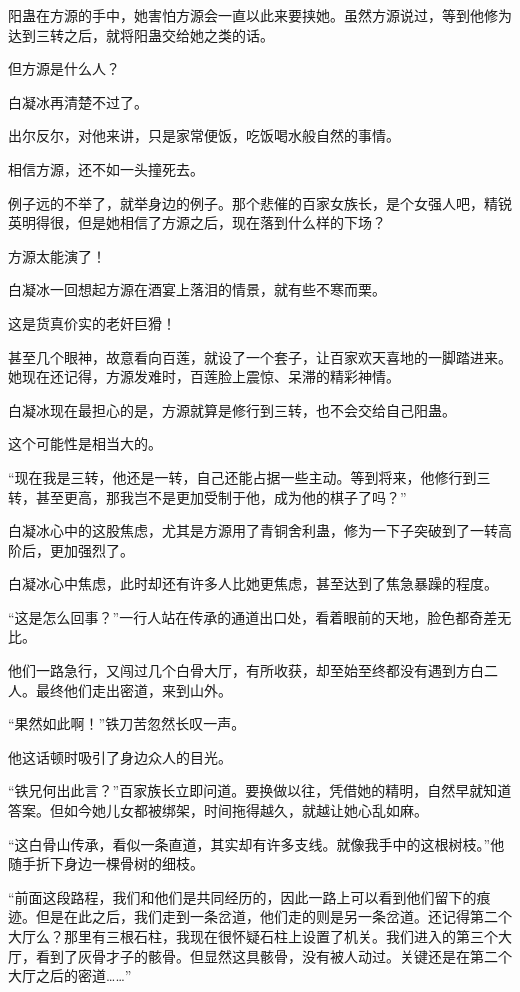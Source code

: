 \begin{this_body}
阳蛊在方源的手中，她害怕方源会一直以此来要挟她。虽然方源说过，等到他修为达到三转之后，就将阳蛊交给她之类的话。

但方源是什么人？

白凝冰再清楚不过了。

出尔反尔，对他来讲，只是家常便饭，吃饭喝水般自然的事情。

相信方源，还不如一头撞死去。

例子远的不举了，就举身边的例子。那个悲催的百家女族长，是个女强人吧，精锐英明得很，但是她相信了方源之后，现在落到什么样的下场？

方源太能演了！

白凝冰一回想起方源在酒宴上落泪的情景，就有些不寒而栗。

这是货真价实的老奸巨猾！

甚至几个眼神，故意看向百莲，就设了一个套子，让百家欢天喜地的一脚踏进来。她现在还记得，方源发难时，百莲脸上震惊、呆滞的精彩神情。

白凝冰现在最担心的是，方源就算是修行到三转，也不会交给自己阳蛊。

这个可能性是相当大的。

“现在我是三转，他还是一转，自己还能占据一些主动。等到将来，他修行到三转，甚至更高，那我岂不是更加受制于他，成为他的棋子了吗？”

白凝冰心中的这股焦虑，尤其是方源用了青铜舍利蛊，修为一下子突破到了一转高阶后，更加强烈了。

白凝冰心中焦虑，此时却还有许多人比她更焦虑，甚至达到了焦急暴躁的程度。

“这是怎么回事？”一行人站在传承的通道出口处，看着眼前的天地，脸色都奇差无比。

他们一路急行，又闯过几个白骨大厅，有所收获，却至始至终都没有遇到方白二人。最终他们走出密道，来到山外。

“果然如此啊！”铁刀苦忽然长叹一声。

他这话顿时吸引了身边众人的目光。

“铁兄何出此言？”百家族长立即问道。要换做以往，凭借她的精明，自然早就知道答案。但如今她儿女都被绑架，时间拖得越久，就越让她心乱如麻。

“这白骨山传承，看似一条直道，其实却有许多支线。就像我手中的这根树枝。”他随手折下身边一棵骨树的细枝。

“前面这段路程，我们和他们是共同经历的，因此一路上可以看到他们留下的痕迹。但是在此之后，我们走到一条岔道，他们走的则是另一条岔道。还记得第二个大厅么？那里有三根石柱，我现在很怀疑石柱上设置了机关。我们进入的第三个大厅，看到了灰骨才子的骸骨。但显然这具骸骨，没有被人动过。关键还是在第二个大厅之后的密道……”


\end{this_body}
